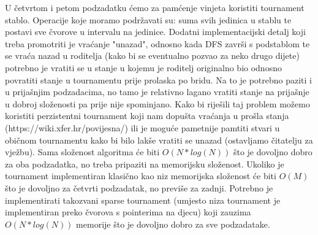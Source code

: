 U četvrtom i petom podzadatku ćemo za pamćenje vinjeta koristiti tournament stablo. Operacije koje moramo podržavati su: suma svih jedinica u stablu te postavi sve čvorove u intervalu na jedinice. Dodatni implementacijski detalj koji treba promotriti je vraćanje "unazad", odnosno kada DFS završi s podstablom te se vraća nazad u roditelja (kako bi se eventualno pozvao za neko drugo dijete) potrebno je vratiti se u stanje u kojemu je roditelj originalno bio odnosno povratiti stanje u tournamentu prije prolaska po bridu. Na to je potrebno paziti i u prijašnjim podzadacima, no tamo je relativno lagano vratiti stanje na prijašnje u dobroj složenosti pa prije nije spominjano. Kako bi riješili taj problem možemo koristiti perzistentni tournament koji nam dopušta vraćanja u prošla stanja (https://wiki.xfer.hr/povijesna/) ili je moguće pametnije pamtiti stvari u običnom tournamentu kako bi bilo lakše vratiti se unazad (ostavljamo čitatelju za vježbu). Sama složenost algoritma će biti $O(N * log(N))$ što je dovoljno dobro za oba podzadatka, no treba pripaziti na memorijsku složenost. Ukoliko je tournament implementiran klasično kao niz memorijska složenost će biti $O(M)$ što je dovoljno za četvrti podzadatak, no previše za zadnji. Potrebno je implementirati takozvani sparse tournament (umjesto niza tournament je implementiran preko čvorova s pointerima na djecu) koji zauzima $O(N * log(N))$ memorije što je dovoljno dobro za sve podzadatake.
